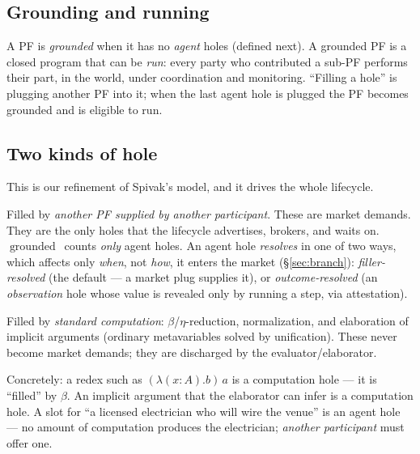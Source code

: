 \documentclass[11pt]{article}
\newcommand{\hole}[2]{\ensuremath{?#1\!:\!#2}}
\newcommand{\grounded}{\ensuremath{\operatorname{grounded}}}
\begin{document}
\subsection{Grounding and running}
A PF is \emph{grounded} when it has no \emph{agent} holes (defined next). A grounded PF is a closed
program that can be \emph{run}: every party who contributed a sub-PF performs their part, in the world,
under coordination and monitoring. ``Filling a hole'' is plugging another PF into it; when the last
agent hole is plugged the PF becomes grounded and is eligible to run.

\subsection{Two kinds of hole}\label{sec:twoholes}
This is our refinement of Spivak's model, and it drives the whole lifecycle.
\begin{description}[leftmargin=0pt,style=nextline,itemsep=4pt]
  \item[Agent holes $\hole{h}{T}$.] Filled by \emph{another PF supplied by another participant}.
  These are market demands. They are the only holes that the lifecycle advertises, brokers, and waits
  on. \grounded\ counts \emph{only} agent holes. An agent hole \emph{resolves} in one of two ways,
  which affects only \emph{when}, not \emph{how}, it enters the market (\S\ref{sec:branch}):
  \emph{filler-resolved} (the default --- a market plug supplies it), or \emph{outcome-resolved}
  (an \emph{observation} hole whose value is revealed only by running a step, via attestation).
  \item[Computation holes.] Filled by \emph{standard computation}: $\beta$/$\eta$-reduction,
  normalization, and elaboration of implicit arguments (ordinary metavariables solved by
  unification). These never become market demands; they are discharged by the evaluator/elaborator.
\end{description}
Concretely: a redex such as $(\lambda(x{:}A).b)\,a$ is a computation hole --- it is ``filled'' by
$\beta$. An implicit argument that the elaborator can infer is a computation hole. A slot for ``a
licensed electrician who will wire the venue'' is an agent hole --- no amount of computation produces
the electrician; \emph{another participant} must offer one.
\end{document}
